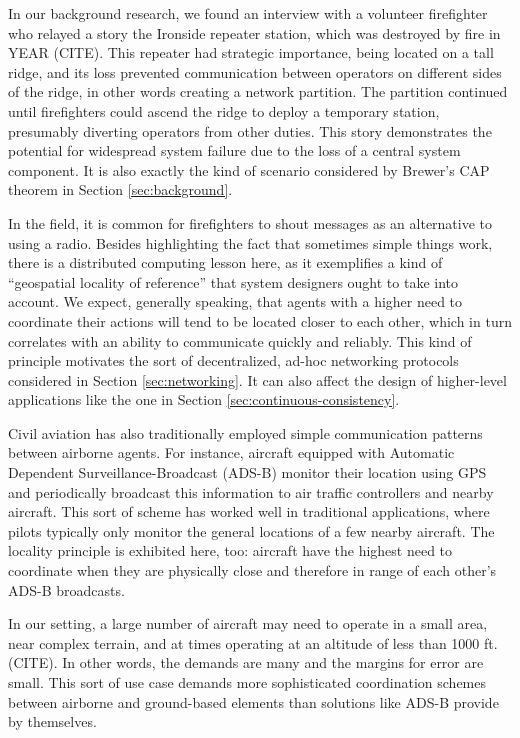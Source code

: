 \documentclass[]             %
{NASA}                       %
\theoremstyle{definition}
\begin{document}
In our background research, we found an interview with a volunteer
firefighter who relayed a story the Ironside repeater station, which was
destroyed by fire in YEAR (CITE). This repeater had strategic
importance, being located on a tall ridge, and its loss prevented
communication between operators on different sides of the ridge, in
other words creating a network partition. The partition continued until
firefighters could ascend the ridge to deploy a temporary station,
presumably diverting operators from other duties. This story
demonstrates the potential for widespread system failure due to the loss
of a central system component. It is also exactly the kind of scenario
considered by Brewer's CAP theorem in Section \ref{sec:background}.

In the field, it is common for firefighters to shout messages as an
alternative to using a radio. Besides highlighting the fact that
sometimes simple things work, there is a distributed computing lesson
here, as it exemplifies a kind of ``geospatial locality of reference''
that system designers ought to take into account. We expect, generally
speaking, that agents with a higher need to coordinate their actions
will tend to be located closer to each other, which in turn correlates
with an ability to communicate quickly and reliably. This kind of
principle motivates the sort of decentralized, ad-hoc networking
protocols considered in Section \ref{sec:networking}. It can also affect
the design of higher-level applications like the one in Section
\ref{sec:continuous-consistency}.

Civil aviation has also traditionally employed simple communication
patterns between airborne agents. For instance, aircraft equipped with
Automatic Dependent Surveillance-Broadcast (ADS-B) monitor their
location using GPS and periodically broadcast this information to air
traffic controllers and nearby aircraft. This sort of scheme has worked
well in traditional applications, where pilots typically only monitor
the general locations of a few nearby aircraft. The locality principle
is exhibited here, too: aircraft have the highest need to coordinate
when they are physically close and therefore in range of each other's
ADS-B broadcasts.

In our setting, a large number of aircraft may need to operate in a
small area, near complex terrain, and at times operating at an altitude
of less than 1000 ft. (CITE). In other words, the demands are many and
the margins for error are small. This sort of use case demands more
sophisticated coordination schemes between airborne and ground-based
elements than solutions like ADS-B provide by themselves.
\end{document}
